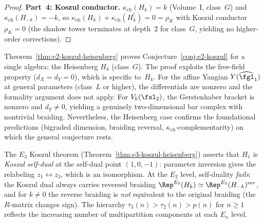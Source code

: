\begin{proof}
\medskip
\noindent\textbf{Part~4: Koszul conductor.}
$\kappa_{\mathrm{ch}}(H_k) = k$ (Volume~I, class~$G$) and
$\kappa_{\mathrm{ch}}(H_{-k}) = -k$, so $\kappa_{\mathrm{ch}}(H_k)
+ \kappa_{\mathrm{ch}}(H_k^!) = 0 = \rho_K$ with Koszul conductor
$\rho_K = 0$ (the shadow tower terminates at depth~$2$ for class~$G$,
yielding no higher-order corrections).
\end{proof}

\begin{remark}
\label{rem:e2-koszul-heisenberg-scope}
Theorem~\ref{thm:e2-koszul-heisenberg} proves
Conjecture~\ref{conj:e2-koszul} for a single algebra: the Heisenberg
$H_k$ (class~$G$). The proof exploits the free-field property
($d_X = d_Y = 0$), which is specific to~$H_k$. For the affine Yangian
$Y(\widehat{\fgl}_1)$ at general parameters (class~$L$ or higher), the
differentials are nonzero and the formality argument does not apply.
For $V_k(\fsl_2)$, the Gerstenhaber bracket is nonzero and $d_Y \neq 0$,
yielding a genuinely two-dimensional bar complex with nontrivial braiding.
Nevertheless, the Heisenberg case confirms the foundational
predictions (bigraded dimension, braiding reversal,
$\kappa_{\mathrm{ch}}$-complementarity) on which the general conjecture
rests.
\end{remark}

\begin{remark}
\label{rem:e2-vs-e3-self-duality}
The $E_3$ Koszul theorem
(Theorem~\ref{thm:e3-koszul-heisenberg}) asserts that $H_1$ is
\emph{Koszul self-dual} at the self-dual point $(1,0,-1)$: parameter
inversion gives the relabeling $z_1 \leftrightarrow z_3$, which is an
isomorphism. At the $E_2$ level, self-duality \emph{fails}: the
Koszul dual always carries reversed braiding
$\Rep^{E_2}(H_k) \simeq \Rep^{E_2}(H_{-k})^{\mathrm{rev}}$, and for
$k \neq 0$ the reverse braiding is \emph{not} equivalent to the
original braiding (the $R$-matrix changes sign). The hierarchy
$\tau_3(n) > \tau_2(n) > p(n)$ for $n \geq 1$ reflects the increasing
number of multipartition components at each $E_n$ level.
\end{remark}

